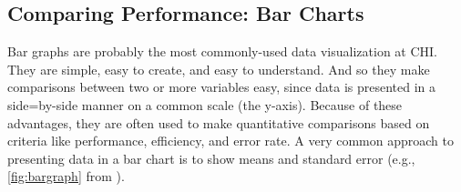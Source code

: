 

 
 







\newpage
\subsection{Comparing Performance: Bar Charts}

Bar graphs are probably the most commonly-used data visualization at CHI. They are simple, easy to create, and easy to understand. And so they make comparisons between two or more variables easy, since data is presented in a side=by-side manner on a common scale (the y-axis). Because of these advantages, they are often used to make quantitative comparisons based on criteria like performance, efficiency, and error rate. A very common approach to presenting data in a bar chart is to show means and standard error  (e.g., \autoref{fig:bargraph} from \citet{pietroszek2015}).







